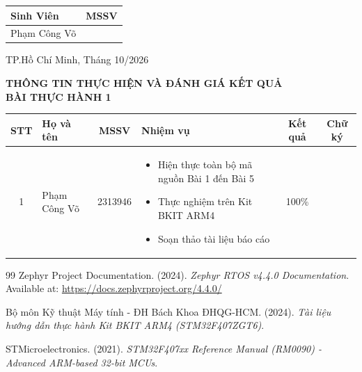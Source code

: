 \documentclass[a4paper]{article}
\begin{document}
\begin{titlepage}
\begin{center}
{\fontsize{13}{14}\selectfont
\begin{tabular}{|>{\centering\arraybackslash}p{7cm}|>{\centering\arraybackslash}p{4cm}|}
\hline
\textbf{Sinh Viên} & \textbf{MSSV} \\
\hline

Phạm Công Võ & 2313946 \\
\hline

\end{tabular}
}
\end{center}


\vspace{1.8cm}
\begin{center}
{\large TP.Hồ Chí Minh, Tháng 10/2026}
\end{center}
\end{titlepage}
\restoregeometry
\restoregeometry

\newpage
\begin{center}
    \textbf{\Large THÔNG TIN THỰC HIỆN VÀ ĐÁNH GIÁ KẾT QUẢ}\\[1ex]
    \textbf{\large BÀI THỰC HÀNH 1}
\end{center}

\vspace{1.5em}

\noindent
\begin{tabularx}{\textwidth}{|c|m{3cm}|c|X|c|c|}
\hline
\textbf{STT} & \textbf{\centering Họ và tên} & \textbf{MSSV} & \textbf{\centering Nhiệm vụ} & \textbf{Kết quả} & \textbf{Chữ ký} \\
\hline
1 & Phạm Công Võ & 2313946 & \begin{itemize}[leftmargin=*]
    \item Hiện thực toàn bộ mã nguồn Bài 1 đến Bài 5
    \item Thực nghiệm trên Kit BKIT ARM4
    \item Soạn thảo tài liệu báo cáo
\end{itemize} & 100\% & \\
\hline
\end{tabularx}

\newpage
\tableofcontents
\newpage



\newpage
{}
\begin{thebibliography}{99}
Zephyr Project Documentation. (2024). \textit{Zephyr RTOS v4.4.0 Documentation}. Available at: \url{https://docs.zephyrproject.org/4.4.0/}

Bộ môn Kỹ thuật Máy tính - ĐH Bách Khoa ĐHQG-HCM. (2024). \textit{Tài liệu hướng dẫn thực hành Kit BKIT ARM4 (STM32F407ZGT6)}.

STMicroelectronics. (2021). \textit{STM32F407xx Reference Manual (RM0090) - Advanced ARM-based 32-bit MCUs}.
\end{thebibliography}
\end{document}
